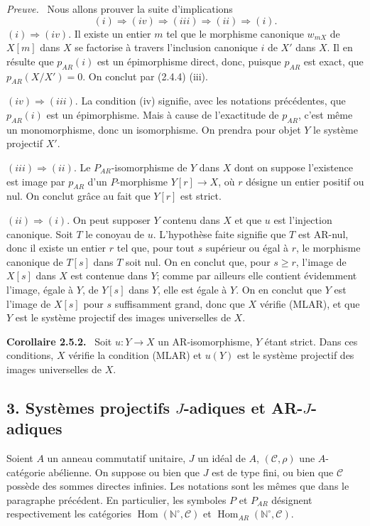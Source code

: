 \documentclass[11pt]{article}
\providecommand{\NN}{\mathbb{N}}
\newenvironment{statement}[1]{\par\medskip\noindent\textbf{#1.}\ }{\par\medskip}
\newenvironment{prooftext}[1][Proof]{\par\noindent\emph{#1.}\ }{\par\medskip}
\DeclareMathOperator{\Hom}{Hom}
\providecommand{\Hom}{\operatorname{Hom}}
\providecommand{\NN}{\mathbb N}
\providecommand{\cC}{\mathcal C}
\begin{document}
\begin{prooftext}[Preuve]
Nous allons prouver la suite d'implications
\[
(i)\Rightarrow(iv)\Rightarrow(iii)\Rightarrow(ii)\Rightarrow(i).
\]
$(i)\Rightarrow(iv)$. Il existe un entier $m$ tel que le morphisme canonique $w_{mX}$ de $X[m]$ dans $X$ se factorise à travers l'inclusion canonique $i$ de $X'$ dans $X$. Il en résulte que $p_{AR}(i)$ est un épimorphisme direct, donc, puisque $p_{AR}$ est exact, que $p_{AR}(X/X')=0$. On conclut par (2.4.4) (iii).

$(iv)\Rightarrow(iii)$. La condition (iv) signifie, avec les notations précédentes, que $p_{AR}(i)$ est un épimorphisme. Mais à cause de l'exactitude de $p_{AR}$, c'est même un monomorphisme, donc un isomorphisme. On prendra pour objet $Y$ le système projectif $X'$.

$(iii)\Rightarrow(ii)$. Le $P_{AR}$-isomorphisme de $Y$ dans $X$ dont on suppose l'existence est image par $p_{AR}$ d'un $P$-morphisme $Y[r]\to X$, où $r$ désigne un entier positif ou nul. On conclut grâce au fait que $Y[r]$ est strict.

$(ii)\Rightarrow(i)$. On peut supposer $Y$ contenu dans $X$ et que $u$ est l'injection canonique. Soit $T$ le conoyau de $u$. L'hypothèse faite signifie que $T$ est AR-nul, donc il existe un entier $r$ tel que, pour tout $s$ supérieur ou égal à $r$, le morphisme canonique de $T[s]$ dans $T$ soit nul. On en conclut que, pour $s\ge r$, l'image de $X[s]$ dans $X$ est contenue dans $Y$; comme par ailleurs elle contient évidemment l'image, égale à $Y$, de $Y[s]$ dans $Y$, elle est égale à $Y$. On en conclut que $Y$ est l'image de $X[s]$ pour $s$ suffisamment grand, donc que $X$ vérifie (MLAR), et que $Y$ est le système projectif des images universelles de $X$.
\end{prooftext}

\begin{statement}{Corollaire 2.5.2}
Soit $u:Y\to X$ un AR-isomorphisme, $Y$ étant strict. Dans ces conditions, $X$ vérifie la condition (MLAR) et $u(Y)$ est le système projectif des images universelles de $X$.
\end{statement}

\subsection*{3. Systèmes projectifs $J$-adiques et AR-$J$-adiques}
Soient $A$ un anneau commutatif unitaire, $J$ un idéal de $A$, $(\cC,\rho)$ une $A$-catégorie abélienne. On suppose ou bien que $J$ est de type fini, ou bien que $\cC$ possède des sommes directes infinies. Les notations sont les mêmes que dans le paragraphe précédent. En particulier, les symboles $P$ et $P_{AR}$ désignent respectivement les catégories $\Hom(\NN^\circ,\cC)$ et $\Hom_{AR}(\NN^\circ,\cC)$.
\end{document}
